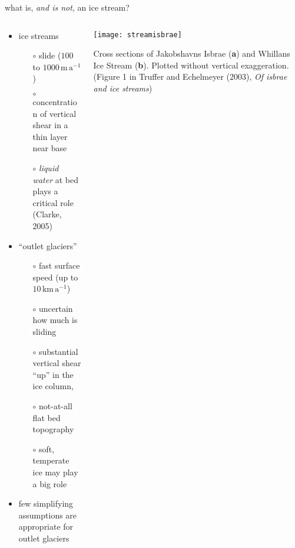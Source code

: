 \begin{frame}{what is, \emph{and is not}, an ice stream?}

\begin{columns}
\begin{column}{0.6\textwidth}
\begin{itemize}
\item ice streams 
  \small
  \begin{itemize}
  \item[$\circ$] slide ($100$ to $1000 \,\text{m}\,\text{a}^{-1}$)
  \item[$\circ$] concentration of vertical shear in a thin layer near base
  \item[$\circ$] \emph{liquid water} at bed plays a critical role (Clarke, 2005)\nocite{Clarke05}
  \end{itemize}
  \normalsize
\item ``outlet glaciers''
  \begin{itemize}
  \item[$\circ$] fast surface speed (up to $10 \,\text{km}\,\text{a}^{-1}$)
  \item[$\circ$] uncertain how much is sliding
  \item[$\circ$] substantial vertical shear ``up'' in the ice column,
  \item[$\circ$] not-at-all flat bed topography
  \item[$\circ$] soft, temperate ice may play a big role
  \end{itemize} 
\item \alert{few simplifying assumptions are appropriate for outlet glaciers}
\end{itemize}
\end{column}

\begin{column}{0.4\textwidth}
\texttt{[image: streamisbrae]}

\bigskip
\scriptsize 
Cross sections of Jakobshavns Isbrae (\textbf{a}) and
Whillans Ice Stream (\textbf{b}).  Plotted
without vertical exaggeration.  (\tiny Figure 1 in Truffer and Echelmeyer (2003), \emph{Of isbrae and ice streams}\scriptsize \nocite{TrufferEchelmeyer})
\end{column}
\end{columns}
\end{frame}


